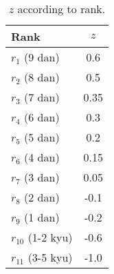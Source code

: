 \begin{table}[h]
    \centering
    \caption{$z$ according to rank.}
    \begin{small}
    \begin{tabular}{lc}
        \toprule
        Rank & $z$ \\
        \midrule
        $r_1$ (9 dan) & 0.6 \\
        $r_2$ (8 dan) & 0.5 \\
        $r_3$ (7 dan) & 0.35 \\
        $r_4$ (6 dan) & 0.3 \\
        $r_5$ (5 dan) & 0.2 \\
        $r_6$ (4 dan) & 0.15 \\
        $r_7$ (3 dan) & 0.05 \\
        $r_8$ (2 dan) & -0.1 \\
        $r_9$ (1 dan) & -0.2 \\
        $r_{10}$ (1-2 kyu) & -0.6 \\
        $r_{11}$ (3-5 kyu) & -1.0 \\
        \bottomrule
    \end{tabular}
    \end{small}
    \label{tbl:z_value}
\end{table}
